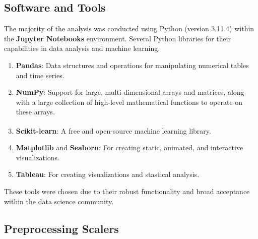 \documentclass{article}
\theoremstyle{mytheoremstyle}
\theoremstyle{mytheoremstyle}
\theoremstyle{myproblemstyle}
\begin{document}
\subsection{Software and Tools}

The majority of the analysis was conducted using Python (version 3.11.4) within the \textbf{Jupyter Notebooks} environment. Several Python libraries for their capabilities in data analysis and machine learning. 

\begin{enumerate}
    \item \textbf{Pandas}: Data structures and operations for manipulating numerical tables and time series.
    \item \textbf{NumPy}: Support for large, multi-dimensional arrays and matrices, along with a large collection of high-level mathematical functions to operate on these arrays.
    \item \textbf{Scikit-learn}: A free and open-source machine learning library.\textsuperscript{\cite{sklearn}} 
    \item \textbf{Matplotlib} and \textbf{Seaborn}: For creating static, animated, and interactive visualizations.
    \item \textbf{Tableau}: For creating visualizations and stastical analysis.
\end{enumerate}

These tools were chosen due to their robust functionality and broad acceptance within the data science community.
\subsection{Preprocessing Scalers}
\end{document}
